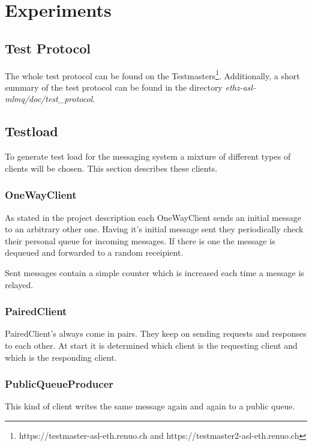 \documentclass[milestone1.tex]{subfiles}
\begin{document}
\section{Experiments}

\subsection{Test Protocol}

The whole test protocol can be found on the Testmasters\footnote{https://testmaster-asl-eth.renuo.ch and https://testmaster2-asl-eth.renuo.ch}. Additionally, a short summary of the test protocol can be found in the directory \textit{ethz-asl-mlmq/doc/test\_protocol}.

\subsection{Testload}
To generate test load for the messaging system a mixture of different types of clients will be chosen. This section describes these clients.

\subsubsection{OneWayClient}
As stated in the project description each OneWayClient sends an initial message to an arbitrary other one. Having it's initial message sent they periodically check their personal queue for incoming messages. If there is one the message is dequeued and forwarded to a random receipient.

Sent messages contain a simple counter which is increased each time a message is relayed.

\subsubsection{PairedClient}
PairedClient's always come in pairs. They keep on sending requests and responses to each other. At start it is determined which client is the requesting client and which is the responding client.

\subsubsection{PublicQueueProducer}
This kind of client writes the same message again and again to a public queue.
\end{document}
